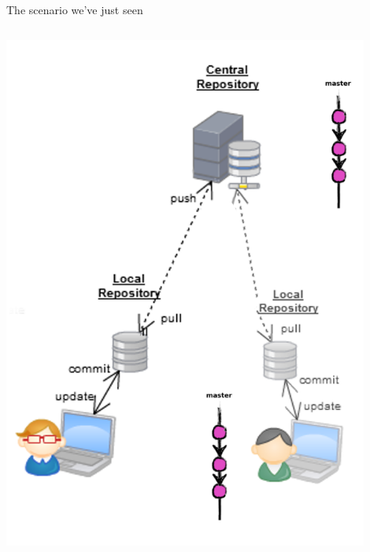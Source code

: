 \begin{frame}[fragile]{The scenario we've just seen}
\begin{columns}
\begin{column}{0.4\textwidth}
\begin{center}
{			}\only<8> {
				\includegraphics[width=0.9\textwidth]{branch_many.png}
			}
	\end{center}
\end{column}
\end{columns}

\end{frame}

